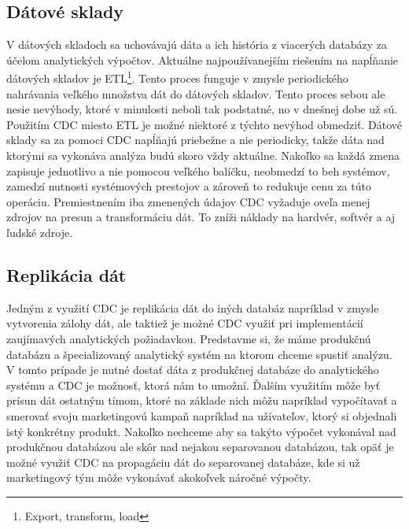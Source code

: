 \subsection{Dátové sklady}
V dátových skladoch sa uchovávajú dáta a ich história z viacerých databázy za účelom analytických výpočtov. Aktuálne najpoužívanejším riešením na napĺňanie dátových skladov je ETL\footnote{Export, transform, load}. Tento proces funguje v zmysle periodického nahrávania veľkého množstva dát do dátových skladov. Tento proces sebou ale nesie nevýhody, ktoré v minulosti neboli tak podstatné, no v dnešnej dobe už sú. Použitím CDC miesto ETL je možné niektoré z týchto nevýhod obmedziť. Dátové sklady sa za pomoci CDC napĺňajú priebežne a nie periodicky, takže dáta nad ktorými sa vykonáva analýza budú skoro vždy aktuálne. Nakoľko sa každá zmena zapisuje jednotlivo a nie pomocou veľkého balíčku, neobmedzí to beh systémov, zamedzí nutnosti systémových prestojov a zároveň to redukuje cenu za túto operáciu. Premiestnením iba zmenených údajov CDC vyžaduje oveľa menej zdrojov na presun a transformáciu dát. To zníži náklady na hardvér, softvér a aj ľudské zdroje. \cite{attunity:etl_cdc}

\subsection{Replikácia dát}
Jedným z využití CDC je replikácia dát do iných databáz napríklad v zmysle vytvorenia zálohy dát, ale taktiež je možné CDC využiť pri implementácií zaujímavých analytických požiadavkou. Predstavme si, že máme produkčnú databázu a špecializovaný analytický systém na ktorom chceme spustiť analýzu. V tomto prípade je nutné dostať dáta z produkčnej databáze do analytického systému a CDC je možnosť, ktorá nám to umožní. Ďalším využitím môže byť prísun dát ostatným tímom, ktoré na základe nich môžu napríklad vypočítavať a smerovať svoju marketingovú kampaň napríklad na užívateľov, ktorý si objednali istý konkrétny produkt. Nakoľko nechceme aby sa takýto výpočet vykonával nad produkčnou databázou ale skôr nad nejakou separovanou databázou, tak opäť je možné využiť CDC na propagáciu dát do separovanej databáze, kde si už marketingový tým môže vykonávať akokoľvek náročné výpočty.

